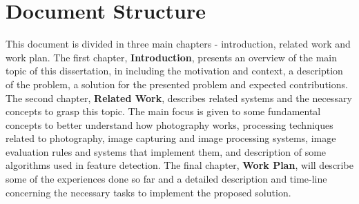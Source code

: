 
\section{Document Structure}

This document is divided in three main chapters - introduction, related work and work plan. The first chapter, \textbf{Introduction}, presents an overview of the main topic of this dissertation, in including the motivation and context, a description of the problem, a solution for the presented problem and expected contributions.
The second chapter, \textbf{Related Work}, describes related systems and the necessary concepts to grasp this topic. The main focus is given to some fundamental concepts to better understand how photography works, processing techniques related to photography, image capturing and image processing systems, image evaluation rules and systems that implement them, and description of some algorithms used in feature detection. The final chapter, \textbf{Work Plan}, will describe some of the experiences done so far and a detailed description and time-line concerning the necessary tasks to implement the proposed solution.